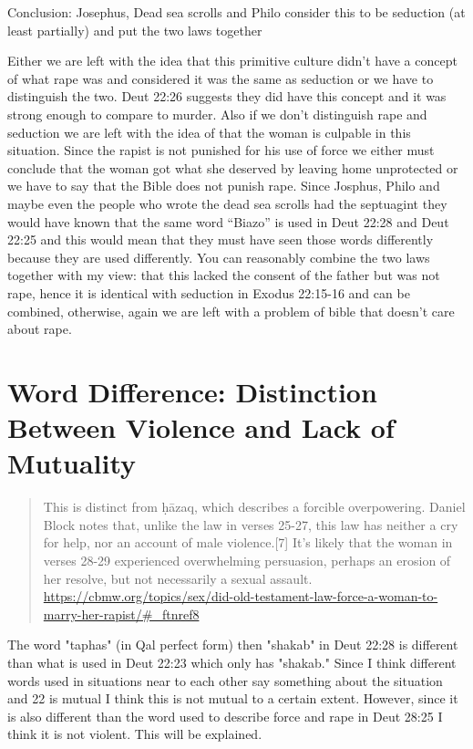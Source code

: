 \documentclass[11pt]{article}
\begin{document}
Conclusion: Josephus, Dead sea scrolls and Philo consider this to be seduction (at least partially) and put the two laws together

Either we are left with the idea that this primitive culture didn’t have a concept of what rape was and considered it was the same as seduction or we have to distinguish the two. Deut 22:26 suggests they did have this concept and it was strong enough to compare to murder. Also if we don’t distinguish rape and seduction we are left with the idea of that the woman is culpable in this situation. Since the rapist is not punished for his use of force we either must conclude that the woman got what she deserved by leaving home unprotected or we have to say that the Bible does not punish rape. Since Josphus, Philo and maybe even the people who wrote the dead sea scrolls had the septuagint they would have known that the same word “Biazo” is used in Deut 22:28 and Deut 22:25 and this would mean that they must have seen those words differently because they are used differently. You can reasonably combine the two laws together with my view: that this lacked the consent of the father but was not rape, hence it is identical with seduction in Exodus 22:15-16 and can be combined, otherwise, again we are left with a problem of bible that doesn’t care about rape. 




\section{Word Difference: Distinction Between Violence and Lack of Mutuality}
\begin{quote}
This is distinct from ḥāzaq, which describes a forcible overpowering. Daniel Block notes that, unlike the law in verses 25-27, this law has neither a cry for help, nor an account of male violence.[7] It’s likely that the woman in verses 28-29 experienced overwhelming persuasion, perhaps an erosion of her resolve, but not necessarily a sexual assault.
\url{https://cbmw.org/topics/sex/did-old-testament-law-force-a-woman-to-marry-her-rapist/#_ftnref8}
\end{quote}
The word "taphas" (in Qal perfect form) then "shakab" in Deut 22:28 is different than what is used in Deut 22:23 which only has "shakab." Since I think different words used in situations near to each other say something about the situation and 22 is mutual I think this is not mutual to a certain extent. However, since it is also different than the word used to describe force and rape in Deut 28:25 I think it is not violent. This will be explained. 
\end{document}
